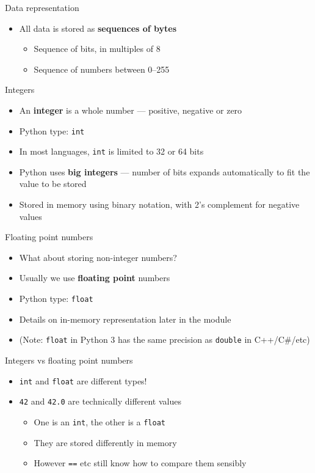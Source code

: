 \begin{frame}{Data representation} 
	\begin{itemize}
		\pause\item All data is stored as \textbf{sequences of bytes}
			\begin{itemize}
				\pause\item Sequence of bits, in multiples of 8
				\pause\item Sequence of numbers between 0--255
			\end{itemize}
	\end{itemize}
\end{frame}

\begin{frame}{Integers}
	\begin{itemize}
		\pause\item An \textbf{integer} is a whole number --- positive, negative or zero
		\pause\item Python type: \lstinline{int}
		\pause\item In most languages, \lstinline{int} is limited to 32 or 64 bits
		\pause\item Python uses \textbf{big integers} --- number of bits expands automatically to fit the value to be stored
		\pause\item Stored in memory using binary notation, with 2's complement for negative values
	\end{itemize}
\end{frame}

\begin{frame}{Floating point numbers}
	\begin{itemize}
		\pause\item What about storing non-integer numbers?
		\pause\item Usually we use \textbf{floating point} numbers
		\pause\item Python type: \lstinline{float}
		\pause\item Details on in-memory representation later in the module
		\pause\item (Note: \lstinline{float} in Python 3 has the same precision as \lstinline{double} in C++/C\#/etc)
	\end{itemize}
\end{frame}

\begin{frame}{Integers vs floating point numbers}
	\begin{itemize}
		\pause\item \lstinline{int} and \lstinline{float} are different types!
		\pause\item \lstinline{42} and \lstinline{42.0} are technically different values
			\begin{itemize}
				\pause\item One is an \lstinline{int}, the other is a \lstinline{float}
				\pause\item They are stored differently in memory
				\pause\item However \lstinline{==} etc still know how to compare them sensibly
			\end{itemize}
	\end{itemize}
\end{frame}

